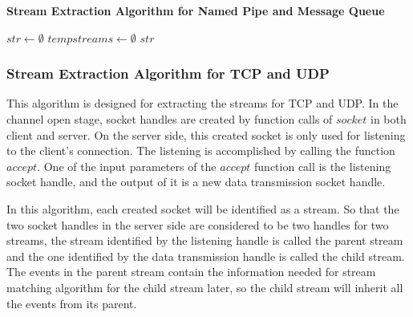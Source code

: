 \begin{algorithm}[H]
\DontPrintSemicolon
\caption{{\bf Stream Extraction Algorithm for Named Pipe and Message Queue} \label{streamext1}}
$str \leftarrow \emptyset$\; 
$tempstreams \leftarrow \emptyset$\;
\KwRet $str$\;
\end{algorithm} 

\subsubsection{Stream Extraction Algorithm for TCP and UDP}
This algorithm is designed for extracting the streams for TCP and UDP. In the channel open stage, socket handles are created by function calls of $socket$ in both client and server. On the server side, this created socket is only used for listening to the client's connection. The listening is accomplished by calling the function $accept$. One of the input parameters of the $accept$ function call is the listening socket handle, and the output of it is a new data transmission socket handle. 


In this algorithm, each created socket will be identified as a stream. So that the two socket handles in the server side are considered to be two handles for two streams, the stream identified by the listening handle is called the parent stream and the one identified by the data transmission handle is called the child stream. The events in the parent stream contain the information needed for stream matching algorithm for the child stream later, so the child stream will inherit all the events from its parent. 


